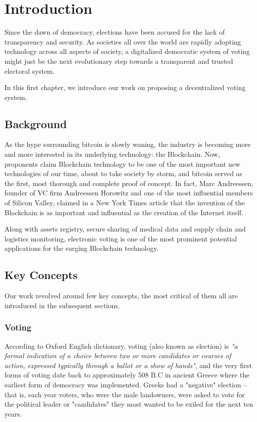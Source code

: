 \chapter{Introduction}

Since the dawn of democracy, elections have been accused for the lack of transparency and security. As societies all over the world are rapidly adopting technology across all aspects of society, a digitalized democratic system of voting might just be the next evolutionary step towards a transparent and trusted electoral system.

In this first chapter, we introduce our work on proposing a decentralized voting system.

\section{Background}

As the hype surrounding bitcoin\cite{satoshinakamotoBitcoinPeertoPeerElectronic} is slowly waning, the industry is becoming more and more interested in its underlying technology: the Blockchain. Now, proponents claim Blockchain technology to be one of the most important new technologies of our time, about to take society by storm, and bitcoin served as the first, most thorough and complete proof of concept. In fact, Marc Andreessen, founder of VC firm Andreessen Horowitz and one of the most influential members of Silicon Valley, claimed in a New York Times article that the invention of the Blockchain is as important and influential as the creation of the Internet itself\cite{andreessenWhyBitcoinMatters1390323270}.\smallskip

Along with assets registry, secure sharing of medical data and supply chain and logistics monitoring, electronic voting is one of the most prominent potential applications for the surging Blockchain technology.

\section{Key Concepts}

Our work revolved around few key concepts, the most critical of them all are introduced in the subsequent sections.

\subsection{Voting}

According to Oxford English dictionary, voting (also known as election) is \textit{"a formal indication of a choice between two or more candidates or courses of action, expressed typically through a ballot or a show of hands"}, and the very first forms of voting date back to approximately 508 B.C in ancient Greece where the earliest form of democracy was implemented\cite{mikehoganHistoryElectionsOnline}. Greeks had a "negative" election -- that is, each year voters, who were the male landowners, were asked to vote for the political leader or "candidates" they most wanted to be exiled for the next ten years.

